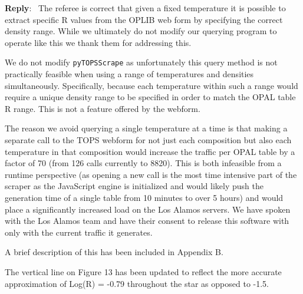 \documentclass[11pt]{article}
\newenvironment{reply}
   {\medskip \noindent \begin{sf}\textbf{Reply}:\  }
   {\medskip \end{sf}}
\begin{document}
\begin{reply}
	The referee is correct that given a fixed temperature it is possible to
	extract specific R values from the OPLIB web form by specifying the correct
	density range. While we ultimately do not modify our querying program to
	operate like this we thank them for addressing this.

	We do not modify \texttt{pyTOPSScrape} as unfortunately this query method is
	not practically feasible when using a range of temperatures and densities
	simultaneously. Specifically, because each temperature within such a range
	would require a unique density range to be specified in order to match the
	OPAL table R range. This is not a feature offered by the webform.

	The reason we avoid querying a single temperature at a time is that making
	a separate call to the TOPS webform for not just each composition but also
	each temperature in that composition would increase the traffic per OPAL
	table by a factor of 70 (from 126 calls currently to 8820). This is both
	infeasible from a runtime perspective (as opening a new call is the most
	time intensive part of the scraper as the JavaScript engine is initialized
	and would likely push the generation time of a single table from 10
	minutes to over 5 hours) and would place a significantly increased load on
	the Los Alamos servers. We have spoken with the Los Alamos team and have
	their consent to release this software with only with the current traffic
	it generates. 

	A brief description of this has been included in Appendix B.

	The vertical line on Figure 13 has been updated to reflect the more accurate 
	approximation of Log(R) = -0.79 throughout the star as opposed to -1.5.
\end{reply}
\end{document}

